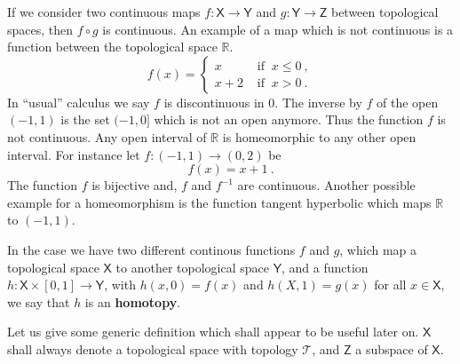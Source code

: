 \documentclass[12pt]{book}
\newcommand{\Tcal}{\mathcal{T}}
\newcommand{\Rbb}{\mathbb{R}}
\newcommand{\Xsf}{\mathsf{X}}
\newcommand{\Ysf}{\mathsf{Y}}
\newcommand{\Zsf}{\mathsf{Z}}
\theoremstyle{break}
\begin{document}
If we consider two continuous maps $f : \Xsf \to \Ysf$ and $g : \Ysf \to \Zsf$ between topological spaces, then $f \circ g$ is continuous. An example of a map which is not continuous is a function between the topological space $\Rbb$.
%
\begin{equation*}
f(x) = \left\{
\begin{array}{ll}
x & \mbox{ if } \ x \leq 0 \ , \\
x + 2 & \mbox{ if } \ x > 0 \ .
\end{array}
\right.
\end{equation*}
%
In ``usual'' calculus we say $f$ is discontinuous in $0$. The inverse by $f$ of the open $(-1,1)$ is the set $(-1,0]$ which is not an open anymore. Thus the function $f$ is not continuous. Any open interval of $\Rbb$ is homeomorphic to any other open interval. For instance let $f: (-1,1) \to (0,2)$ be
%
\begin{equation*}
f(x) = x + 1 \ . 
\end{equation*}
%
The function $f$ is bijective and, $f$ and $f^{-1}$ are continuous. Another possible example for a homeomorphism is the function tangent hyperbolic which maps $\Rbb$ to $(-1,1)$.




In the case we have two different continous functions $f$ and $g$, which map a topological space $\Xsf$ to another topological space $\Ysf$, and a function $h : \Xsf \times [0,1] \to \Ysf$, with  $h(x,0) = f(x)$ and $h(X,1) = g(x)$ for all $x \in \Xsf$, we say that $h$ is an \textbf{homotopy}.




Let us give some generic definition which shall appear to be useful later on. $\Xsf$ shall always denote a topological space with topology $\Tcal$, and $\Zsf$ a subspace of $\Xsf$.%
\end{document}
